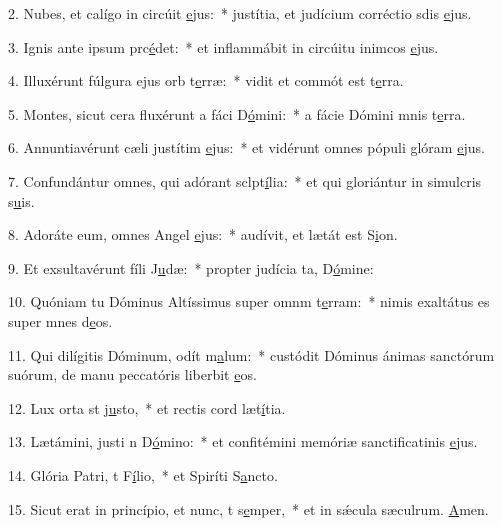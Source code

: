 2. Nubes, et calígo in circúit \uline{e}jus:~* justítia, et judícium corréctio sdis \uline{e}jus.\par 
3. Ignis ante ipsum prc\uline{é}det:~* et inflammábit in circúitu inimcos \uline{e}jus.\par 
4. Illuxérunt fúlgura ejus orb t\uline{e}rræ:~* vidit et commót est t\uline{e}rra.\par 
5. Montes, sicut cera fluxérunt a fáci D\uline{ó}mini:~* a fácie Dómini mnis t\uline{e}rra.\par 
6. Annuntiavérunt cæli justítim \uline{e}jus:~* et vidérunt omnes pópuli glóram \uline{e}jus.\par 
7. Confundántur omnes, qui adórant sclpt\uline{í}lia:~* et qui gloriántur in simulcris s\uline{u}is.\par 
8. Adoráte eum, omnes Angel \uline{e}jus:~* audívit, et lætát est S\uline{i}on.\par 
9. Et exsultavérunt fíli J\uline{u}dæ:~* propter judícia ta, D\uline{ó}mine:\par 
10. Quóniam tu Dóminus Altíssimus super omnm t\uline{e}rram:~* nimis exaltátus es super mnes d\uline{e}os.\par 
11. Qui dilígitis Dóminum, odít m\uline{a}lum:~* custódit Dóminus ánimas sanctórum suórum, de manu peccatóris liberbit \uline{e}os.\par 
12. Lux orta st j\uline{u}sto,~* et rectis cord læt\uline{í}tia.\par 
13. Lætámini, justi n D\uline{ó}mino:~* et confitémini memóriæ sanctificatinis \uline{e}jus.\par 
14. Glória Patri, t F\uline{í}lio,~* et Spiríti S\uline{a}ncto.\par 
15. Sicut erat in princípio, et nunc, t s\uline{e}mper,~* et in sǽcula sæculrum. \uline{A}men.\par 
